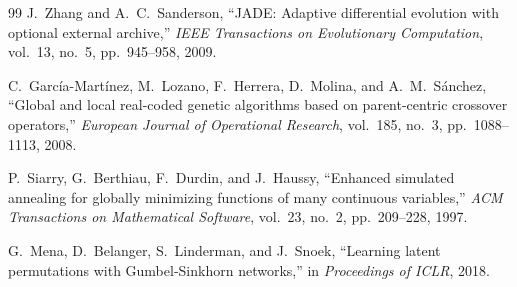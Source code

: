 \begin{thebibliography}{99}
J.~Zhang and A.~C.~Sanderson,
``JADE: Adaptive differential evolution with optional external archive,''
\emph{IEEE Transactions on Evolutionary Computation},
vol.~13, no.~5, pp.~945--958, 2009.

C.~Garc\'ia-Mart\'inez, M.~Lozano, F.~Herrera, D.~Molina, and A.~M.~S\'anchez,
``Global and local real-coded genetic algorithms based on parent-centric crossover operators,''
\emph{European Journal of Operational Research},
vol.~185, no.~3, pp.~1088--1113, 2008.

P.~Siarry, G.~Berthiau, F.~Durdin, and J.~Haussy,
``Enhanced simulated annealing for globally minimizing functions of many continuous variables,''
\emph{ACM Transactions on Mathematical Software},
vol.~23, no.~2, pp.~209--228, 1997.

G.~Mena, D.~Belanger, S.~Linderman, and J.~Snoek,
``Learning latent permutations with Gumbel-Sinkhorn networks,''
in \emph{Proceedings of ICLR}, 2018.

\end{thebibliography}
